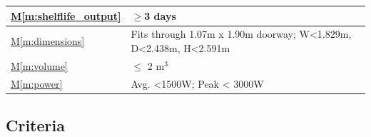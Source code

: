 \documentclass{../tex/report}
\newcommand{\mref}[1]{\hyperref[#1]{M\ref{#1}}}
\begin{document}
\begin{tabular}{|l|p{14.35cm}|}
    \mref{m:shelflife_output}           & $\ge$3 days                                                       \hfill \cite{dsfc-phase2}                               \\ \hline
    \mref{m:dimensions}                 & Fits through 1.07m x 1.90m doorway; W<1.829m, D<2.438m, H<2.591m  \hfill \cite{applicantguide,dsfc-phase2}                \\ \hline
    \mref{m:volume}                     & $\le$ 2 m${}^3$                                                   \hfill \cite{applicantguide,dsfc-phase2}                \\ \hline
    \mref{m:power}                      & Avg. <1500W; Peak < 3000W                                         \hfill \cite{applicantguide,dsfc-phase2}                \\ \hline
\end{tabular}

\subsection{Criteria}
\label{sec:criteria}
\end{document}
